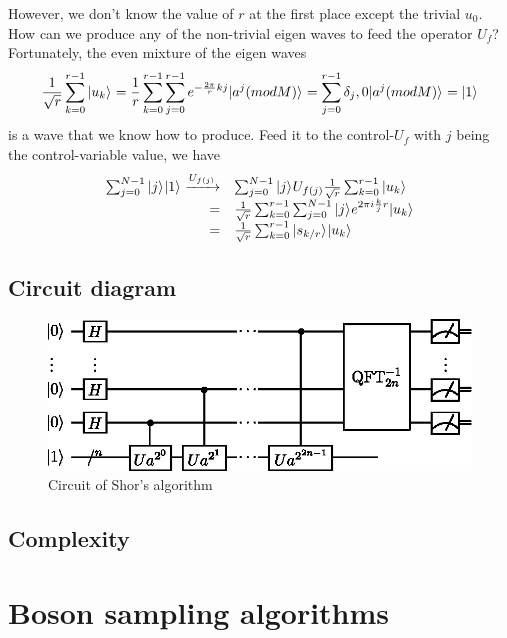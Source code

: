 \documentclass[Letter,11pt]{book}
\begin{document}
However, we don't know the value of $r$ at the first place except the trivial $u_0$. How can we produce any of the non-trivial eigen waves to feed the operator $U_f$? Fortunately, the even mixture of the eigen waves
\begin{equation}\label{sum_u}
    \frac 1 {\sqrt{r}} \sum^{r-1}_{k=0}\vert {u_k} \rangle_{} = \frac 1 r \sum^{r-1}_{k=0} \sum^{r-1}_{j=0} e^{-{\frac {2\pi} r} kj} \vert {a^j (mod M)} \rangle_{} = \sum^{r-1}_{j=0} \delta_j,0 \vert {a^j (mod M)} \rangle_{} = \vert {1} \rangle_{}
\end{equation}
is a wave that we know how to produce. Feed it to the control-$U_f$ with $j$ being the control-variable value, we have
\begin{equation}\label{ctrl_u}
\begin{array}{rl}
 \sum^{N-1}_{j=0} \vert {j} \rangle_{} \vert {1} \rangle_{} \xrightarrow{U_{f(j)}} & \sum^{N-1}_{j=0} \vert {j} \rangle_{} U_{f(j)} \frac 1 {\sqrt{r}} \sum^{r-1}_{k=0}\vert {u_k} \rangle_{}\\
    = & \frac 1 {\sqrt{r}} \sum^{r-1}_{k=0} \sum^{N-1}_{j=0} \vert {j} \rangle_{} e^{2\pi i \frac kj r} \vert {u_k} \rangle_{}\\
    = & \frac 1 {\sqrt{r}} \sum^{r-1}_{k=0} \vert {s_{k/r}} \rangle_{} \vert {u_k} \rangle_{}
\end{array}
\end{equation}

\subsection{Circuit diagram}
\begin{figure}[ht]
\includegraphics[width=12cm]{pic/Shor_algorithm.eps}
\caption{Circuit of Shor's algorithm}
\label{ShorAlgorithm}
\end{figure}

\subsection{Complexity}

\section{Boson sampling algorithms}
\end{document}
